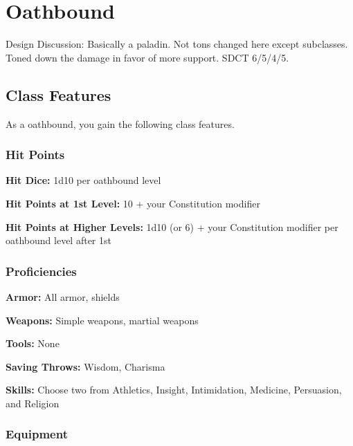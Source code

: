 \section{Oathbound}

Design Discussion: Basically a paladin. Not tons changed here except subclasses. Toned down the damage in favor of more support. SDCT 6/5/4/5.

\subsection{Class Features}

As a oathbound, you gain the following class features.

\subsubsection{Hit Points}

\textbf{Hit Dice:} 1d10 per oathbound level

\textbf{Hit Points at 1st Level:} 10 + your Constitution modifier

\textbf{Hit Points at Higher Levels:} 1d10 (or 6) + your Constitution modifier per oathbound level after 1st

\subsubsection{Proficiencies}

\textbf{Armor:} All armor, shields

\textbf{Weapons:} Simple weapons, martial weapons

\textbf{Tools:} None

\textbf{Saving Throws:} Wisdom, Charisma

\textbf{Skills:} Choose two from Athletics, Insight, Intimidation, Medicine, Persuasion, and Religion

\subsubsection{Equipment}

